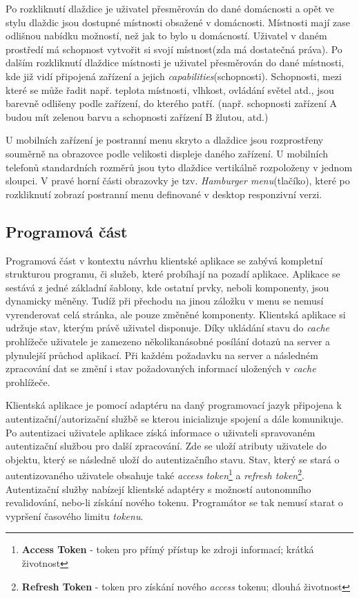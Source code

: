 Po rozkliknutí dlaždice je uživatel přesměrován do dané domácnosti a opět ve stylu dlaždic jsou dostupné místnosti obsažené v domácnosti.
Místnosti mají zase odlišnou nabídku možností, než jak to bylo u domácností.
Uživatel v daném prostředí má schopnost vytvořit si svojí místnost(zda má dostatečná práva).
Po dalším rozkliknutí dlaždice místnosti je uživatel přesměrován do dané místnosti, kde již vidí připojená zařízení a jejich \emph{capabilities}(schopnosti).
Schopnosti, mezi které se může řadit např. teplota místnosti, vlhkost, ovládání světel atd., jsou barevně odlišeny podle zařízení, do kterého patří. (např. schopnosti zařízení A budou mít zelenou barvu a schopnosti zařízení B žlutou, atd.)

U mobilních zařízení je postranní menu skryto a dlaždice jsou rozprostřeny souměrně na obrazovce podle velikosti displeje daného zařízení.
U mobilních telefonů standardních rozměrů jsou tyto dlaždice vertikálně rozpoloženy v jednom sloupci.
V pravé horní části obrazovky je tzv. \emph{Hamburger menu}(tlačíko), které po rozkliknutí zobrazí postranní menu definované v desktop responzivní verzi.

\subsection*{Programová část}
\label{frontend:program}
Programová část v kontextu návrhu klientské aplikace se zabývá kompletní strukturou programu, či služeb, které probíhají na pozadí aplikace.
Aplikace se sestává z jedné základní šablony, kde ostatní prvky, neboli komponenty, jsou dynamicky měněny.
Tudíž při přechodu na jinou záložku v menu se nemusí vyrenderovat celá stránka, ale pouze změněné komponenty.
Klientská aplikace si udržuje stav, kterým právě uživatel disponuje.
Díky ukládání stavu do \emph{cache} prohlížeče uživatele je zamezeno několikanásobné posílání dotazů na server a plynulejší průchod aplikací.
Při každém požadavku na server a následném zpracování dat se změní i stav požadovaných informací uložených v \emph{cache} prohlížeče.

Klientská aplikace je pomocí adaptéru na daný programovací jazyk připojena k autentizační/autorizační službě se kterou inicializuje spojení a dále komunikuje.
Po autentizaci uživatele aplikace získá informace o uživateli spravovaném autentizační službou pro další zpracování.
Zde se uloží atributy uživatele do objektu, který se následně uloží do autentizačního stavu.
Stav, který se stará o autentizovaného uživatele obsahuje také \emph{access token}\footnote{\textbf{Access Token} - token pro přímý přístup ke zdroji informací; krátká životnost} a \emph{refresh token}\footnote{\textbf{Refresh Token} - token pro získání nového \emph{access} tokenu; dlouhá životnost}.
Autentizační služby nabízejí klientské adaptéry s možností autonomního revalidování, nebo-li získání nového tokenu.
Programátor se tak nemusí starat o vypršení časového limitu \emph{tokenu}.

